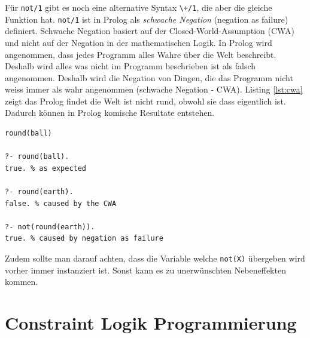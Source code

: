 Für \verb|not/1| gibt es noch eine alternative Syntax \verb|\+/1|, die aber die gleiche Funktion hat. \verb|not/1| ist in Prolog als \textit{schwache Negation} (negation as failure) definiert. Schwache Negation basiert auf der Closed-World-Assumption (CWA) und nicht auf der Negation in der mathematischen Logik. In Prolog wird angenommen, dass jedes Programm alles Wahre über die Welt beschreibt. Deshalb wird alles was nicht im Programm beschrieben ist als falsch angenommen. Deshalb wird die Negation von Dingen, die das Programm nicht weiss immer als wahr angenommen (schwache Negation - CWA). Listing \ref{lst:cwa} zeigt das Prolog findet die Welt ist nicht rund, obwohl sie dass eigentlich ist. Dadurch können in Prolog komische Resultate entstehen.

\begin{lstlisting}[caption=CWA, label=lst:cwa]
round(ball)

?- round(ball).
true. % as expected

?- round(earth).
false. % caused by the CWA

?- not(round(earth)).
true. % caused by negation as failure
\end{lstlisting}

Zudem sollte man darauf achten, dass die Variable welche \verb|not(X)| übergeben wird vorher immer instanziert ist. Sonst kann es zu unerwünschten Nebeneffekten kommen.

\section{Constraint Logik Programmierung}

